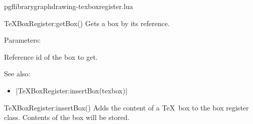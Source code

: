 
\begin{filedescription}{pgflibrarygraphdrawing-texboxregister.lua}


\begin{luacommand}{{TeXBoxRegister:getBox}()}
Gets a box by its reference.

Parameters:
\begin{parameterdescription}
	\item[\meta{boxReference}] Reference id of the box to get.
\end{parameterdescription}



See also:
\begin{itemize}
	\item[] |TeXBoxRegister:insertBox(texbox)|
\end{itemize}

\end{luacommand}
\begin{luacommand}{{TeXBoxRegister:insertBox}()}
Adds the content of a \TeX\ box to the box register class. Contents of the box will be stored. 



\end{luacommand}

\end{filedescription}